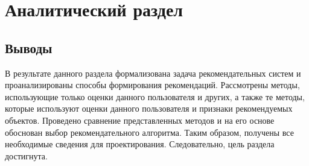 \chapter{Аналитический раздел}







\section*{Выводы}
В результате данного раздела формализована задача рекомендательных систем и проанализированы способы формирования рекомендаций.
Рассмотрены методы, использующие только оценки данного пользователя и других, а также те методы, которые используют оценки данного пользователя и признаки рекомендуемых объектов.
Проведено сравнение представленных методов и на его основе обоснован выбор рекомендательного алгоритма.
Таким образом, получены все необходимые сведения для проектирования.
Следовательно, цель раздела достигнута.